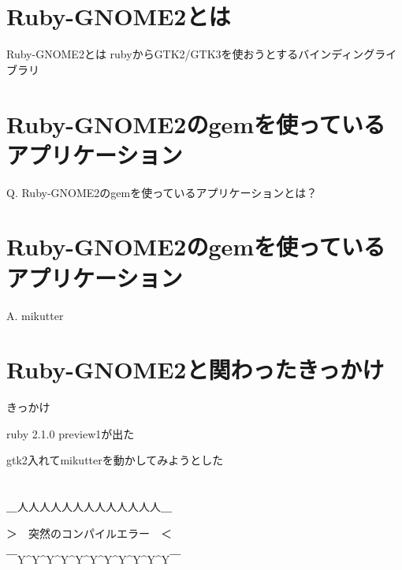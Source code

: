 \section{Ruby-GNOME2とは}
\begin{frame}
\begin{block}{Ruby-GNOME2とは}
{\huge
rubyからGTK2/GTK3を使おうとするバインディングライブラリ
}
\end{block}
\end{frame}

\section{Ruby-GNOME2のgemを使っているアプリケーション}
\begin{frame}
\begin{block}{}
{\huge
Q. Ruby-GNOME2のgemを使っているアプリケーションとは？
}
\end{block}
\end{frame}

\section{Ruby-GNOME2のgemを使っているアプリケーション}
\begin{frame}
\begin{block}{}
{\huge
A. mikutter
}
\end{block}
\end{frame}

\section{Ruby-GNOME2と関わったきっかけ}
\begin{frame}
\begin{block}{きっかけ}
\begin{itemize}
{\Large
\item ruby 2.1.0 preview1が出た
\item gtk2入れてmikutterを動かしてみようとした
}
\end{itemize}
\end{block}
\end{frame}

\section{}

\begin{frame}
\begin{center}
{\huge
＿人人人人人人人人人人人人人＿

＞　突然のコンパイルエラー　＜

￣Y\^{}Y\^{}Y\^{}Y\^{}Y\^{}Y\^{}Y\^{}Y\^{}Y\^{}Y\^{}Y￣
}
\end{center}
\end{frame}
